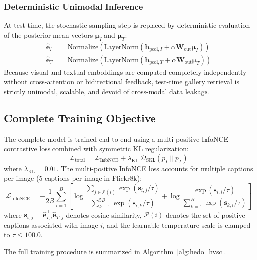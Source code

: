 \documentclass[11pt,journal,onecolumn,draftcls]{IEEEtran}
\begin{document}
\subsubsection{Deterministic Unimodal Inference}
At test time, the stochastic sampling step is replaced by deterministic evaluation of the posterior mean vectors $\boldsymbol{\mu}_I$ and $\boldsymbol{\mu}_T$:
\begin{align}
\hat{\mathbf{e}}_I &= \text{Normalize}\left( \text{LayerNorm}(\mathbf{h}_{\text{pool}, I} + \alpha \mathbf{W}_{\text{out}} \boldsymbol{\mu}_I) \right) \\
\hat{\mathbf{e}}_T &= \text{Normalize}\left( \text{LayerNorm}(\mathbf{h}_{\text{pool}, T} + \alpha \mathbf{W}_{\text{out}} \boldsymbol{\mu}_T) \right)
\end{align}
Because visual and textual embeddings are computed completely independently without cross-attention or bidirectional feedback, test-time gallery retrieval is strictly unimodal, scalable, and devoid of cross-modal data leakage.

\subsection{Complete Training Objective}
The complete model is trained end-to-end using a multi-positive InfoNCE contrastive loss combined with symmetric KL regularization:
\begin{equation}
\mathcal{L}_{\text{total}} = \mathcal{L}_{\text{InfoNCE}} + \lambda_{\text{KL}} \, \mathcal{D}_{\text{SKL}}(p_I \parallel p_T)
\end{equation}
where $\lambda_{\text{KL}} = 0.01$. The multi-positive InfoNCE loss accounts for multiple captions per image (5 captions per image in Flickr8k):
\begin{equation}
\mathcal{L}_{\text{InfoNCE}} = -\frac{1}{2B} \sum_{i=1}^B \left[ \log \frac{\sum_{j \in \mathcal{P}(i)} \exp(\mathbf{s}_{i,j} / \tau)}{\sum_{k=1}^{5B} \exp(\mathbf{s}_{i,k} / \tau)} + \log \frac{\exp(\mathbf{s}_{i,i} / \tau)}{\sum_{k=1}^B \exp(\mathbf{s}_{k,i} / \tau)} \right]
\end{equation}
where $\mathbf{s}_{i,j} = \hat{\mathbf{e}}_{I, i}^\top \hat{\mathbf{e}}_{T, j}$ denotes cosine similarity, $\mathcal{P}(i)$ denotes the set of positive captions associated with image $i$, and the learnable temperature scale is clamped to $\tau \le 100.0$.

The full training procedure is summarized in Algorithm~\ref{alg:hedo_hvsc}.
\end{document}

